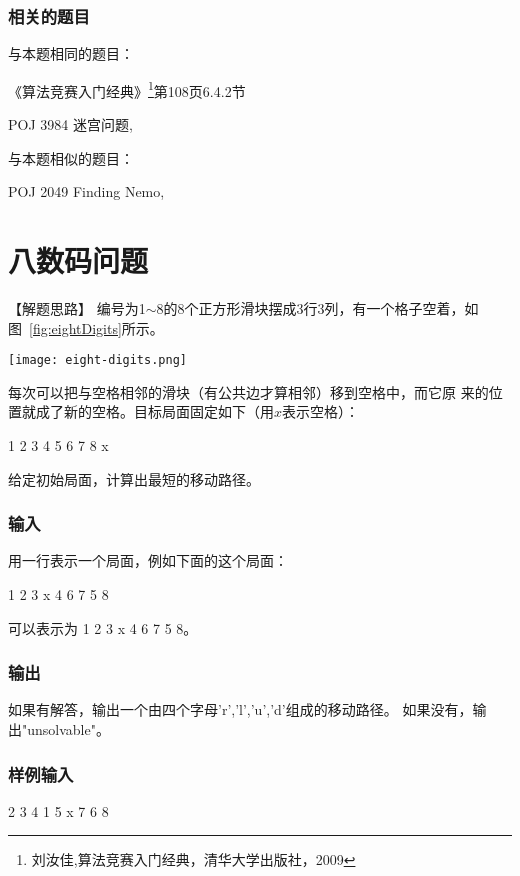 \subsubsection{相关的题目}
与本题相同的题目：
\begindot
\item 《算法竞赛入门经典》\footnote{刘汝佳,算法竞赛入门经典，清华大学出版社，2009}第108页6.4.2节
\item  POJ 3984 迷宫问题, 
\myenddot

与本题相似的题目：
\begindot
\item  POJ 2049 Finding Nemo, 
\myenddot


\section{八数码问题} %
\label{subsec:eightDigits}

【解题思路】
编号为1$\sim$8的8个正方形滑块摆成3行3列，有一个格子空着，如图~\ref{fig:eightDigits}所示。

\begin{center}
\texttt{[image: eight-digits.png]}\\
\label{fig:eightDigits}
\end{center}

每次可以把与空格相邻的滑块（有公共边才算相邻）移到空格中，而它原
来的位置就成了新的空格。目标局面固定如下（用$x$表示空格）：
\begin{Code}
1 2 3
4 5 6
7 8 x
\end{Code}

给定初始局面，计算出最短的移动路径。

\subsubsection{输入}
用一行表示一个局面，例如下面的这个局面：
\begin{Code}
 1  2  3
 x  4  6
 7  5  8
\end{Code}
可以表示为 1 2 3 x 4 6 7 5 8。 

\subsubsection{输出}
如果有解答，输出一个由四个字母'r','l','u','d'组成的移动路径。
如果没有，输出"unsolvable"。 

\subsubsection{样例输入}
\begin{Code}
2  3  4  1  5  x  7  6  8
\end{Code}

